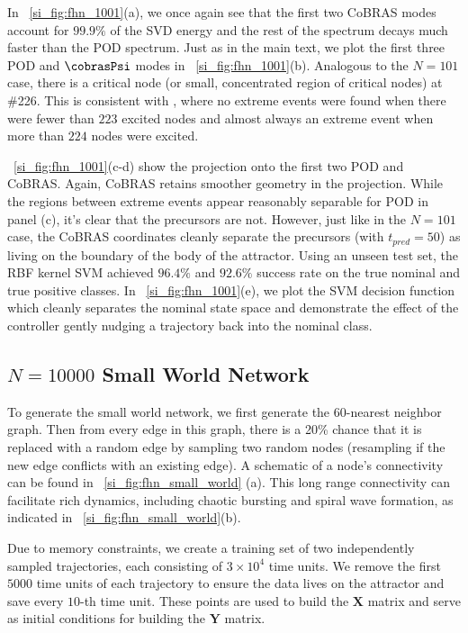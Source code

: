 \documentclass[twocolumn,10pt]{article}
\begin{document}
In \figurename ~\ref{si_fig:fhn_1001}(a), we once again see that the first two CoBRAS modes account for $99.9\%$ of the SVD energy and the rest of the spectrum decays much faster than the POD spectrum. Just as in the main text, we plot the first three POD and $\cobrasPsi$ modes in \figurename ~\ref{si_fig:fhn_1001}(b). Analogous to the $N=101$ case, there is a critical node (or small, concentrated region of critical nodes) at \#226. This is consistent with \cite{ansmann2013a}, where no extreme events were found when there were fewer than $223$ excited nodes and almost always an extreme event when more than $224$  nodes were excited. 

\figurename ~\ref{si_fig:fhn_1001}(c-d) show the projection onto the first two POD and CoBRAS. Again, CoBRAS retains smoother geometry in the projection. While the regions between extreme events appear reasonably separable for POD in panel (c), it's clear that the precursors are not. However, just like in the $N=101$ case, the CoBRAS coordinates cleanly separate the precursors (with $t_{pred} = 50$) as living on the boundary of the body of the attractor. Using an unseen test set, the RBF kernel SVM achieved $96.4\%$ and $92.6\%$ success rate on the true nominal and true positive classes. In \figurename ~\ref{si_fig:fhn_1001}(e), we plot the SVM decision function which cleanly separates the nominal state space and demonstrate the effect of the controller gently nudging a trajectory back into the nominal class. 



\clearpage
\subsection{$N=10000$ Small World Network}
\label{si:fhn_small_world}
To generate the small world network, we first generate the $60$-nearest neighbor graph. Then from every edge in this graph, there is a 20\% chance that it is replaced with a random edge by sampling two random nodes (resampling if the new edge conflicts with an existing edge). A schematic of a node's connectivity can be found in \figurename ~\ref{si_fig:fhn_small_world}   (a). This long range connectivity can facilitate rich dynamics, including chaotic bursting and spiral wave formation, as indicated in \figurename ~\ref{si_fig:fhn_small_world}(b). 

Due to memory constraints, we create a training set of two independently sampled trajectories, each consisting of $3\times 10^4$ time units. We remove the first $5000$ time units of each trajectory to ensure the data lives on the attractor and save every $10$-th time unit. These points are used to build the $\mathbf X$ matrix and serve as initial conditions for building the $\mathbf Y$ matrix. 
\end{document}
